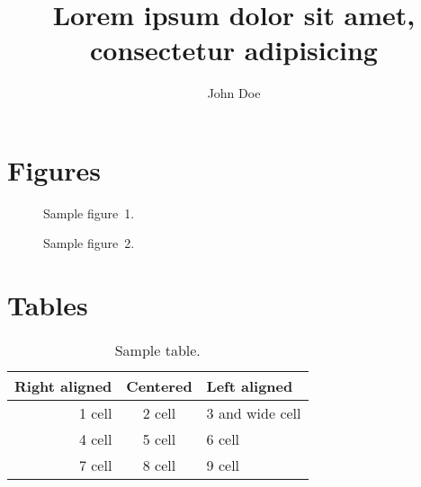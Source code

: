 \documentclass[slanted]{acmeyatcl} %
\begin{document}
\title{Lorem ipsum dolor sit amet, consectetur adipisicing}
\author{John Doe}



\maketitle

\nocite{lorem, ipsum}


\begin{abstract}
  \blindtext
\end{abstract}


\begin{twocols}

\Blinddocument

\end{twocols}


\section*{Figures}

\begin{twocols}

  \begin{figure}[H]
    \centering
    \caption{Sample figure~1.}
  \end{figure}

  \begin{figure}[H]
    \centering
    \caption{Sample figure~2.}
  \end{figure}

\end{twocols}


\section*{Tables}

\begin{table}[H]
  \centering
  \begin{tabular}{rcl}
    \toprule
      \bfseries Right aligned &
      \bfseries Centered &
      \bfseries Left aligned \\
    \midrule
      1\up{st} cell & 2\up{nd} cell & 3\up{rd} and wide cell \\
      4\up{th} cell & 5\up{th} cell & 6\up{th} cell \\
      7\up{th} cell & 8\up{th} cell & 9\up{th} cell \\
    \bottomrule
  \end{tabular}
  \caption{Sample table.}
\end{table}



\end{document}

